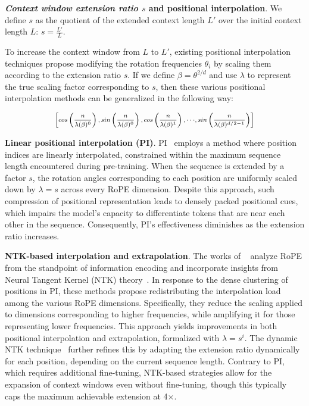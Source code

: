 \textbf{\emph{Context window extension ratio $s$} and positional interpolation}. We define $s$ as the quotient of the extended context length $L'$ over the initial context length $L$: $s=\frac{L'}{L}$.

To increase the context window from $L$ to $L'$, existing positional interpolation techniques propose modifying the rotation frequencies $\theta_i$ by scaling them according to the extension ratio $s$. If we define $\beta=\theta^{2/d}$ and use $\lambda$ to represent the true scaling factor corresponding to $s$, then these various positional interpolation methods can be generalized in the following way:

\begin{equation}	
	\fontsize{7.5}{7.5} \selectfont
	\label{eq:unified_rope}
	\begin{aligned}
		\left[cos\left(\frac{n}{\lambda(\beta)^0}\right), sin \left(\frac{n}{\lambda(\beta)^0}\right), cos\left(\frac{n}{\lambda(\beta)^1}\right), \cdot\cdot\cdot,  sin \left(\frac{n}{\lambda(\beta)^{d/2-1}}\right) \right]   
	\end{aligned}
\end{equation}

\textbf{Linear positional interpolation (PI)}. PI~\cite{pi} employs a method where position indices are linearly interpolated, constrained within the maximum sequence length encountered during pre-training. When the sequence is extended by a factor $s$, the rotation angles corresponding to each position are uniformly scaled down by $\lambda=s$ across every RoPE dimension. Despite this approach, such compression of positional representation leads to densely packed positional cues, which impairs the model's capacity to differentiate tokens that are near each other in the sequence. Consequently, PI's effectiveness diminishes as the extension ratio increases.

\textbf{NTK-based interpolation and extrapolation}. The works of ~\cite{ntk,dynamicntk} analyze RoPE from the standpoint of information encoding and incorporate insights from Neural Tangent Kernel (NTK) theory~\cite{jacot2018neural,tancik2020fourier}. In response to the dense clustering of positions in PI, these methods propose redistributing the interpolation load among the various RoPE dimensions. Specifically, they reduce the scaling applied to dimensions corresponding to higher frequencies, while amplifying it for those representing lower frequencies. This approach yields improvements in both positional interpolation and extrapolation, formalized with $\lambda=s^{i}$. The dynamic NTK technique~\cite{dynamicntk} further refines this by adapting the extension ratio dynamically for each position, depending on the current sequence length. Contrary to PI, which requires additional fine-tuning, NTK-based strategies allow for the expansion of context windows even without fine-tuning, though this typically caps the maximum achievable extension at 4$\times$.

